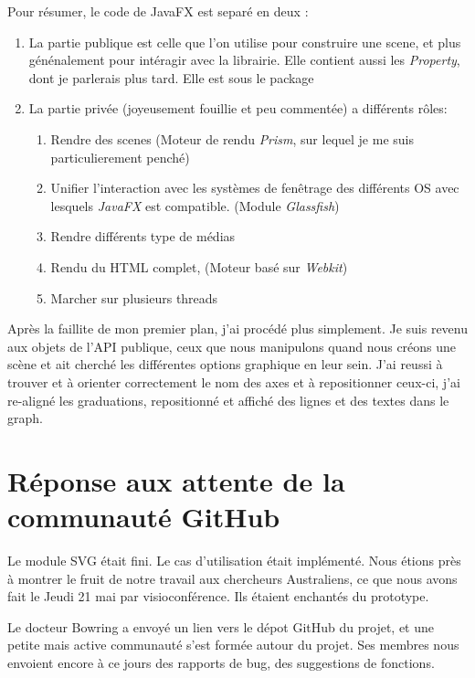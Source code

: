 Pour résumer, le code de JavaFX est separé en deux :
\begin{enumerate}
\item La partie publique est celle que l'on utilise pour construire une scene, et plus génénalement pour intéragir avec la librairie. Elle contient aussi les \textit{Property}, dont je parlerais plus tard. Elle est sous le package %
\item La partie privée (joyeusement fouillie et peu commentée) a différents rôles:%
  \begin{enumerate}	
  \item Rendre des scenes (Moteur de rendu \textit{Prism}, sur lequel je me suis particulierement penché)
  \item Unifier l'interaction avec les systèmes de fenêtrage des différents OS avec lesquels \textit{JavaFX} est compatible. (Module \textit{Glassfish})
  \item Rendre différents type de médias
  \item Rendu du HTML complet, (Moteur basé sur \textit{Webkit})
  \item Marcher sur plusieurs threads
  \end{enumerate}
\end{enumerate}

Après la faillite de mon premier plan, j'ai procédé plus simplement. Je suis revenu aux objets de l'API publique, ceux que nous manipulons quand nous créons une scène et ait cherché les différentes options graphique en leur sein. J'ai reussi à trouver et à orienter correctement le nom des axes et à repositionner ceux-ci, j'ai re-aligné les graduations, repositionné et affiché des lignes et des textes dans le graph.

%
%
%
\section{Réponse aux attente de la communauté GitHub}
Le module SVG était fini. Le cas d'utilisation était implémenté. Nous étions près à montrer le fruit de notre travail aux chercheurs Australiens, ce que nous avons fait le Jeudi%
21 mai par visioconférence. Ils étaient enchantés du prototype.

Le docteur Bowring a envoyé un lien vers le dépot GitHub du projet, et une petite mais active communauté s'est formée autour du projet. Ses membres nous envoient encore à ce jours des rapports de bug, des suggestions de fonctions.

